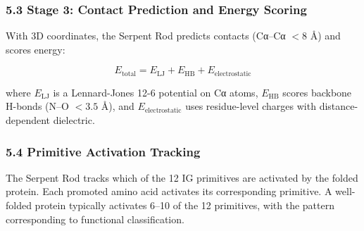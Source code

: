 \documentclass[12pt,a4paper]{article}
\begin{document}
\hypertarget{stage-3-contact-prediction-and-energy-scoring}{%
\subsubsection{5.3 Stage 3: Contact Prediction and Energy
Scoring}\label{stage-3-contact-prediction-and-energy-scoring}}

With 3D coordinates, the Serpent Rod predicts contacts (Cα--Cα \(< 8\)
Å) and scores energy:

\[E_{\text{total}} = E_{\text{LJ}} + E_{\text{HB}} + E_{\text{electrostatic}}\]

where \(E_{\text{LJ}}\) is a Lennard-Jones 12-6 potential on Cα atoms,
\(E_{\text{HB}}\) scores backbone H-bonds (N--O \(< 3.5\) Å), and
\(E_{\text{electrostatic}}\) uses residue-level charges with
distance-dependent dielectric.

\hypertarget{primitive-activation-tracking}{%
\subsubsection{5.4 Primitive Activation
Tracking}\label{primitive-activation-tracking}}

The Serpent Rod tracks which of the 12 IG primitives are activated by
the folded protein. Each promoted amino acid activates its corresponding
primitive. A well-folded protein typically activates 6--10 of the 12
primitives, with the pattern corresponding to functional classification.
\end{document}
